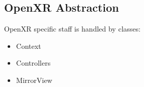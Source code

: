 \newpage

\subsection{OpenXR Abstraction}
\label{sec:openxr}
OpenXR specific staff is handled by classes:
\begin{itemize}
    \item Context
    \item Controllers
    \item  MirrorView
\end{itemize}


